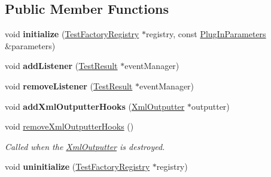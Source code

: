 \subsection*{Public Member Functions}
\begin{DoxyCompactItemize}
\item 
\hypertarget{class_test_plug_in_default_impl_a37c0b83c0a94ef97113b35ae70316883}{void {\bfseries initialize} (\hyperlink{class_test_factory_registry}{Test\-Factory\-Registry} $\ast$registry, const \hyperlink{class_plug_in_parameters}{Plug\-In\-Parameters} \&parameters)}\label{class_test_plug_in_default_impl_a37c0b83c0a94ef97113b35ae70316883}

\item 
\hypertarget{class_test_plug_in_default_impl_a0180a801dd78be5741a200e866684b20}{void {\bfseries add\-Listener} (\hyperlink{class_test_result}{Test\-Result} $\ast$event\-Manager)}\label{class_test_plug_in_default_impl_a0180a801dd78be5741a200e866684b20}

\item 
\hypertarget{class_test_plug_in_default_impl_a26364a3a81e48ff9adcef1a5cd3e40df}{void {\bfseries remove\-Listener} (\hyperlink{class_test_result}{Test\-Result} $\ast$event\-Manager)}\label{class_test_plug_in_default_impl_a26364a3a81e48ff9adcef1a5cd3e40df}

\item 
\hypertarget{class_test_plug_in_default_impl_aed4c5b89adaa0bb0b4f11cc4aca782a2}{void {\bfseries add\-Xml\-Outputter\-Hooks} (\hyperlink{class_xml_outputter}{Xml\-Outputter} $\ast$outputter)}\label{class_test_plug_in_default_impl_aed4c5b89adaa0bb0b4f11cc4aca782a2}

\item 
void \hyperlink{class_test_plug_in_default_impl_aa4fa891e799ff362dece734417afd93d}{remove\-Xml\-Outputter\-Hooks} ()
\begin{DoxyCompactList}\small\item\em Called when the \hyperlink{class_xml_outputter}{Xml\-Outputter} is destroyed. \end{DoxyCompactList}\item 
\hypertarget{class_test_plug_in_default_impl_aab567f339bbda38e759b7bd631ad8b8c}{void {\bfseries uninitialize} (\hyperlink{class_test_factory_registry}{Test\-Factory\-Registry} $\ast$registry)}\label{class_test_plug_in_default_impl_aab567f339bbda38e759b7bd631ad8b8c}

\end{DoxyCompactItemize}


